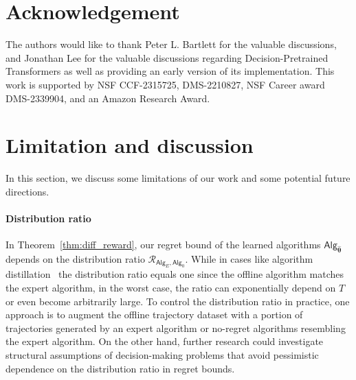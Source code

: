 \documentclass[10pt]{article}
\newcommand{\<}{\left\langle}
\renewcommand{\>}{\right\rangle}
\newcommand{\totlen}{{T}}
\newcommand{\sAlg}{{\mathsf{Alg}}}
\newcommand{\esttfpar}{{\widehat{\btheta}}}
\newcommand{\shortexp}{{E}}
\newcommand{\distratio}{{\mathcal{R}}}
\def\btheta{{\boldsymbol \theta}}
\begin{document}
\section*{Acknowledgement}

The authors would like to thank Peter L. Bartlett for the valuable discussions, and Jonathan Lee for the valuable discussions regarding Decision-Pretrained Transformers as well as providing an early version of its implementation. This work is supported by NSF CCF-2315725, DMS-2210827, NSF Career award DMS-2339904, and an Amazon Research Award.





\clearpage
\appendix
\tableofcontents
\clearpage





\section{Limitation and discussion}
\label{sec:limitation}
In this section, we discuss some limitations of our work and some potential future directions.

\paragraph{Distribution ratio} In Theorem~\ref{thm:diff_reward}, our regret bound of the learned algorithms $\sAlg_{\esttfpar}$ depends on the distribution ratio $\distratio_{\sAlg_{\shortexp},\sAlg_0}$. While in cases like algorithm distillation~\citep{laskin2022context} the distribution ratio equals one since the offline algorithm matches the expert algorithm, in the worst case, the ratio can exponentially depend on $\totlen$ or even become arbitrarily large. To control the distribution ratio in practice, one approach is to augment the offline trajectory dataset with a portion of trajectories generated by an expert algorithm or no-regret algorithms resembling the expert algorithm. On the other hand, further research could investigate structural assumptions of decision-making problems that avoid pessimistic dependence on the distribution ratio in regret bounds.
\end{document}

